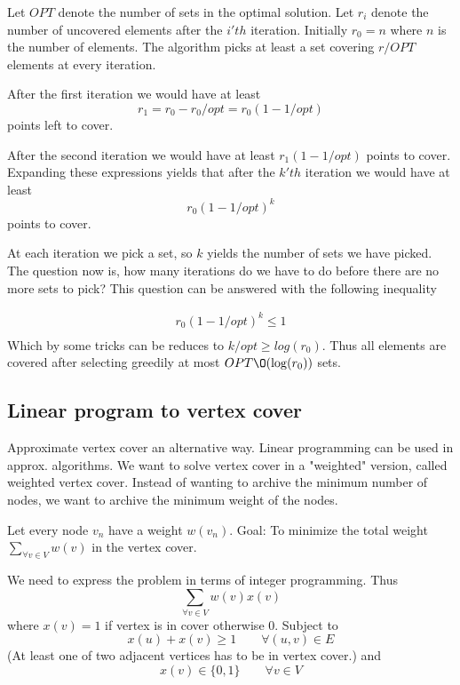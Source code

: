 \documentclass[10pt]{article}
\begin{document}
Let $OPT$ denote the number of sets in the optimal solution. Let $r_i$ denote the number of uncovered elements after the $i'th$ iteration. Initially $r_0 = n$ where $n$ is the number of elements. The algorithm picks at least a set covering $r/OPT$ elements at every iteration. 

After the first iteration we would have at least 
\begin{equation}
r_1 = r_0-r_0/opt=r_0(1-1/opt)  
\end{equation}
points left to cover. 

After the second iteration we would have at least $r_1(1-1/opt)$ points to cover. Expanding these expressions yields that after the $k'th$ iteration we would have at least 
\begin{equation}
  r_0(1-1/opt)^k  
\end{equation}
points to cover.

At each iteration we pick a set, so $k$ yields the number of sets we have picked. The question now is, how many iterations do we have to do before there are no more sets to pick? This question can be answered with the following inequality

\begin{align}
r_0(1-1/opt)^k \leq 1 \\
\end{align}
Which by some tricks can be reduces to $k/opt \geq log(r_0)$. Thus all elements are covered after selecting greedily at most $OPT \O(\log(r_0))$ sets.

\subsection{Linear program to vertex cover} %
\label{sub:linear_program_to_set_cover}
Approximate vertex cover an alternative way. Linear programming can be used in approx. algorithms. We want to solve vertex cover in a "weighted" version, called weighted vertex cover. Instead of wanting to archive the minimum number of nodes, we want to archive the minimum weight of the nodes.

Let every node $v_n$ have a weight $w(v_n)$. Goal: To minimize the total weight $\sum_{\forall v \in V} w(v)$ in the vertex cover. 

We need to express the problem in terms of integer programming. Thus
\begin{equation}
\sum_{\forall v \in V} w(v) x(v)  
\end{equation}
where $x(v)=1$ if vertex is in cover otherwise $0$. Subject to
\begin{equation}
  x(u)+x(v) \geq 1 \qquad \forall (u,v) \in E
\end{equation}
(At least one of two adjacent vertices has to be in vertex cover.) and
\begin{equation}
    x(v)  \in \{0,1\} \qquad \forall v \in V 
\end{equation}
\end{document}

